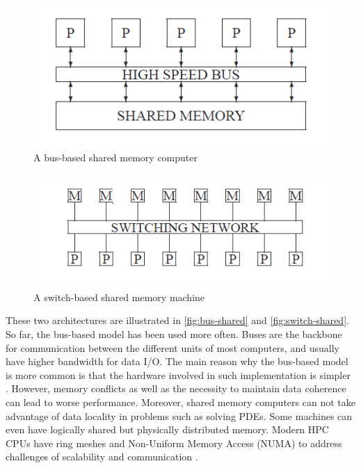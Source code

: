 \begin{figure}[h!]
    \centering
    \includegraphics[width=\linewidth]{figures/bus-based-shared-memory.png}
    \caption{A bus-based shared memory computer \citep{doi:10.1137/1.9780898718003}}
    \label{fig:bus-shared}
\end{figure}

\begin{figure}[h!]
    \centering
    \includegraphics[width=\linewidth]{figures/switch-based-shared-memory.png}
    \caption{A switch-based shared memory machine \citep{doi:10.1137/1.9780898718003}}
    \label{fig:switch-shared}
\end{figure}

These two architectures are illustrated in \autoref{fig:bus-shared} and \autoref{fig:switch-shared}. So far, the bus-based model has been used more often. Buses are the backbone for communication between the different units of most computers, and usually have higher bandwidth for data I/O. The main reason why the bus-based model is more common is that the hardware involved in such implementation is simpler \citep{adeli1987parallel}. However, memory conflicts as well as the necessity to maintain data coherence can lead to worse performance. Moreover, shared memory computers can not take advantage of data locality in problems such as solving PDEs. Some machines can even have logically shared but physically distributed memory.
Modern HPC CPUs have ring meshes and Non-Uniform Memory Access (NUMA) to address challenges of scalability and communication \citep{569606,10.1145/1854273.1854350}.

